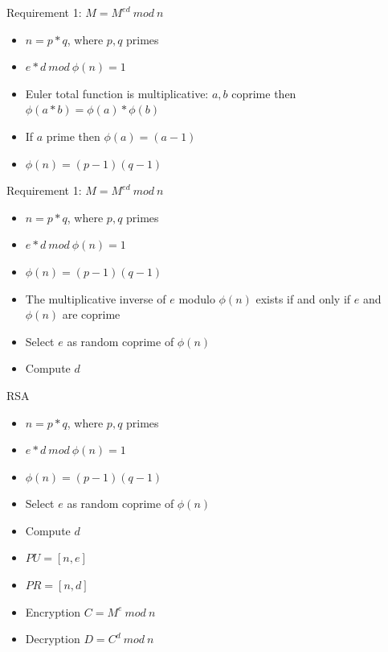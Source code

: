 \documentclass{beamer}
\begin{document}
\begin{frame}{Requirement 1: $M = M^{ed}\ mod\ n$}
  \begin{itemize}
    \item $n=p*q$, where $p,q$ primes 
    \item $e*d\ mod\ \phi(n) = 1$
    \item<2-> Euler total function is multiplicative: $a,b$ coprime then $\phi(a*b) = \phi(a)*\phi(b)$
    \item<3-> If $a$ prime then $\phi(a) = (a-1)$ 
    \item<4-> $\phi(n) = (p-1)(q-1)$
  \end{itemize}
\end{frame}

\begin{frame}{Requirement 1: $M = M^{ed}\ mod\ n$}
  \begin{itemize}
    \item $n=p*q$, where $p,q$ primes 
    \item $e*d\ mod\ \phi(n) = 1$
    \item $\phi(n) = (p-1)(q-1)$
    \item<2-> The multiplicative inverse of $e$ modulo $\phi(n)$ exists if and only if $e$ and $\phi(n)$ are coprime
    \item<3-> Select $e$ as random coprime of $\phi(n)$
    \item<4-> Compute $d$
  \end{itemize}
\end{frame}

\begin{frame}{RSA}
  \begin{itemize}
    \item $n=p*q$, where $p,q$ primes 
    \item $e*d\ mod\ \phi(n) = 1$
    \item $\phi(n) = (p-1)(q-1)$
    \item Select $e$ as random coprime of $\phi(n)$
    \item Compute $d$
    \item $PU = [n,e]$ 
    \item $PR = [n,d]$
    \item Encryption $C = M^e\ mod\ n$
    \item Decryption $D = C^d\ mod\ n$
  \end{itemize}
\end{frame}
\end{document}
